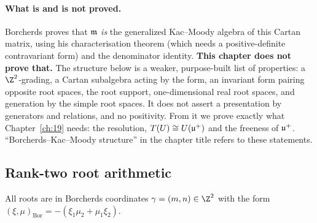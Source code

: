 \paragraph{What is and is not proved.}  Borcherds proves that $\mathfrak{m}$ \emph{is} the generalized Kac--Moody algebra of this Cartan
matrix, using his characterisation theorem (which needs a positive-definite contravariant form) and the denominator identity.
\textbf{This chapter does not prove that.}  The structure  below is a weaker, purpose-built list of
properties: a $\Z^2$-grading, a Cartan subalgebra acting by the form, an invariant form pairing opposite root spaces, the root
support, one-dimensional real root spaces, and generation by the simple root spaces.  It does not assert a presentation by
generators and relations, and no positivity.  From it we prove exactly what Chapter~\ref{ch:19} needs: the resolution, $T(U)\cong\mathcal
\mathcal U(\mathfrak{u}^+)$ and the freeness of $\mathfrak{u}^+$.  ``Borcherds--Kac--Moody structure'' in the chapter title refers to these statements.

\subsection{Rank-two root arithmetic}

All roots are in Borcherds coordinates $\gamma=(m,n)\in\Z^2$ with the form $(\xi,\mu)_{\mathrm{Bor}}=-(\xi_1\mu_2+\mu_1\xi_2)$.

